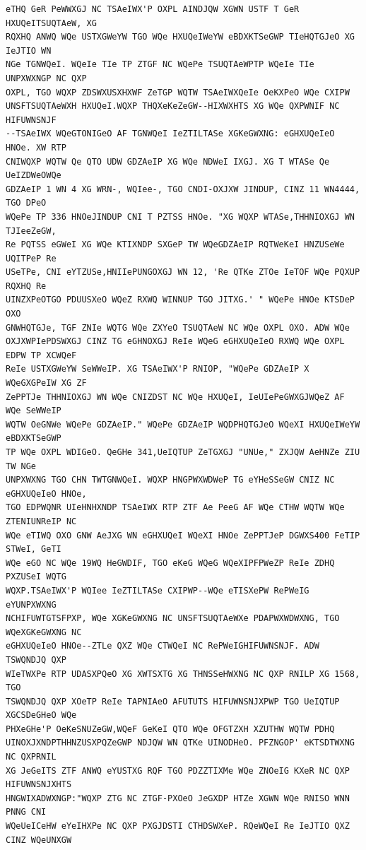 \documentclass[12pt,a4paper]{article}
\begin{document}
\begin{lstlisting}[caption={Complete text after iteration 1}, label={lst:iter1}]
eTHQ GeR PeWWXGJ NC TSAeIWX'P OXPL AINDJQW XGWN USTF T GeR HXUQeITSUQTAeW, XG
RQXHQ ANWQ WQe USTXGWeYW TGO WQe HXUQeIWeYW eBDXKTSeGWP TIeHQTGJeO XG IeJTIO WN
NGe TGNWQeI. WQeIe TIe TP ZTGF NC WQePe TSUQTAeWPTP WQeIe TIe UNPXWXNGP NC QXP
OXPL, TGO WQXP ZDSWXUSXHXWF ZeTGP WQTW TSAeIWXQeIe OeKXPeO WQe CXIPW
UNSFTSUQTAeWXH HXUQeI.WQXP THQXeKeZeGW--HIXWXHTS XG WQe QXPWNIF NC HIFUWNSNJF
--TSAeIWX WQeGTONIGeO AF TGNWQeI IeZTILTASe XGKeGWXNG: eGHXUQeIeO HNOe. XW RTP
CNIWQXP WQTW Qe QTO UDW GDZAeIP XG WQe NDWeI IXGJ. XG T WTASe Qe UeIZDWeOWQe
GDZAeIP 1 WN 4 XG WRN-, WQIee-, TGO CNDI-OXJXW JINDUP, CINZ 11 WN4444, TGO DPeO
WQePe TP 336 HNOeJINDUP CNI T PZTSS HNOe. "XG WQXP WTASe,THHNIOXGJ WN TJIeeZeGW,
Re PQTSS eGWeI XG WQe KTIXNDP SXGeP TW WQeGDZAeIP RQTWeKeI HNZUSeWe UQITPeP Re
USeTPe, CNI eYTZUSe,HNIIePUNGOXGJ WN 12, 'Re QTKe ZTOe IeTOF WQe PQXUP RQXHQ Re
UINZXPeOTGO PDUUSXeO WQeZ RXWQ WINNUP TGO JITXG.' " WQePe HNOe KTSDeP OXO
GNWHQTGJe, TGF ZNIe WQTG WQe ZXYeO TSUQTAeW NC WQe OXPL OXO. ADW WQe
OXJXWPIePDSWXGJ CINZ TG eGHNOXGJ ReIe WQeG eGHXUQeIeO RXWQ WQe OXPL EDPW TP XCWQeF
ReIe USTXGWeYW SeWWeIP. XG TSAeIWX'P RNIOP, "WQePe GDZAeIP X WQeGXGPeIW XG ZF
ZePPTJe THHNIOXGJ WN WQe CNIZDST NC WQe HXUQeI, IeUIePeGWXGJWQeZ AF WQe SeWWeIP
WQTW OeGNWe WQePe GDZAeIP." WQePe GDZAeIP WQDPHQTGJeO WQeXI HXUQeIWeYW eBDXKTSeGWP
TP WQe OXPL WDIGeO. QeGHe 341,UeIQTUP ZeTGXGJ "UNUe," ZXJQW AeHNZe ZIU TW NGe
UNPXWXNG TGO CHN TWTGNWQeI. WQXP HNGPWXWDWeP TG eYHeSSeGW CNIZ NC eGHXUQeIeO HNOe,
TGO EDPWQNR UIeHNHXNDP TSAeIWX RTP ZTF Ae PeeG AF WQe CTHW WQTW WQe ZTENIUNReIP NC
WQe eTIWQ OXO GNW AeJXG WN eGHXUQeI WQeXI HNOe ZePPTJeP DGWXS400 FeTIP STWeI, GeTI
WQe eGO NC WQe 19WQ HeGWDIF, TGO eKeG WQeG WQeXIPFPWeZP ReIe ZDHQ PXZUSeI WQTG
WQXP.TSAeIWX'P WQIee IeZTILTASe CXIPWP--WQe eTISXePW RePWeIG eYUNPXWXNG
NCHIFUWTGTSFPXP, WQe XGKeGWXNG NC UNSFTSUQTAeWXe PDAPWXWDWXNG, TGO WQeXGKeGWXNG NC
eGHXUQeIeO HNOe--ZTLe QXZ WQe CTWQeI NC RePWeIGHIFUWNSNJF. ADW TSWQNDJQ QXP
WIeTWXPe RTP UDASXPQeO XG XWTSXTG XG THNSSeHWXNG NC QXP RNILP XG 1568, TGO
TSWQNDJQ QXP XOeTP ReIe TAPNIAeO AFUTUTS HIFUWNSNJXPWP TGO UeIQTUP XGCSDeGHeO WQe
PHXeGHe'P OeKeSNUZeGW,WQeF GeKeI QTO WQe OFGTZXH XZUTHW WQTW PDHQ
UINOXJXNDPTHHNZUSXPQZeGWP NDJQW WN QTKe UINODHeO. PFZNGOP' eKTSDTWXNG NC QXPRNIL
XG JeGeITS ZTF ANWQ eYUSTXG RQF TGO PDZZTIXMe WQe ZNOeIG KXeR NC QXP HIFUWNSNJXHTS
HNGWIXADWXNGP:"WQXP ZTG NC ZTGF-PXOeO JeGXDP HTZe XGWN WQe RNISO WNN PNNG CNI
WQeUeICeHW eYeIHXPe NC QXP PXGJDSTI CTHDSWXeP. RQeWQeI Re IeJTIO QXZ CINZ WQeUNXGW

\end{lstlisting}
\end{document}

